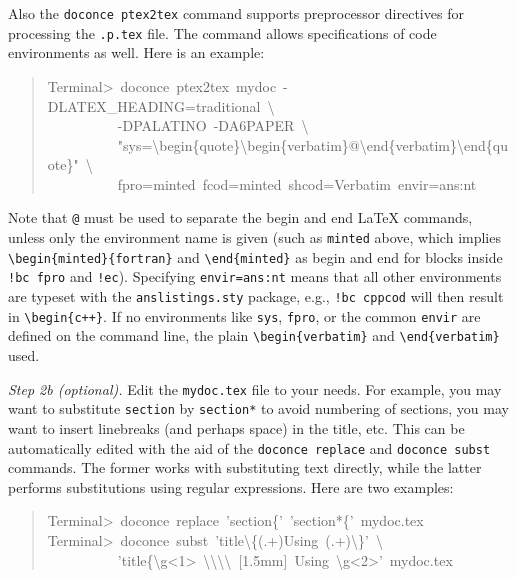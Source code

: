 \documentclass[a4paper]{article}
\begin{document}
Also the \texttt{doconce ptex2tex} command supports preprocessor directives
for processing the \texttt{.p.tex} file. The command allows specifications
of code environments as well. Here is an example:
%
\begin{quote}{\ttfamily \raggedright \noindent
Terminal>~doconce~ptex2tex~mydoc~-DLATEX\_HEADING=traditional~\textbackslash{}\\
~~~~~~~~~~-DPALATINO~-DA6PAPER~\textbackslash{}\\
~~~~~~~~~~"sys=\textbackslash{}begin\{quote\}\textbackslash{}begin\{verbatim\}@\textbackslash{}end\{verbatim\}\textbackslash{}end\{quote\}"~\textbackslash{}\\
~~~~~~~~~~fpro=minted~fcod=minted~shcod=Verbatim~envir=ans:nt
}
\end{quote}

Note that \texttt{@} must be used to separate the begin and end LaTeX
commands, unless only the environment name is given (such as \texttt{minted}
above, which implies \texttt{\textbackslash{}begin\{minted\}\{fortran\}} and \texttt{\textbackslash{}end\{minted\}} as
begin and end for blocks inside \texttt{!bc fpro} and \texttt{!ec}).  Specifying
\texttt{envir=ans:nt} means that all other environments are typeset with the
\texttt{anslistings.sty} package, e.g., \texttt{!bc cppcod} will then result in
\texttt{\textbackslash{}begin\{c++\}}. If no environments like \texttt{sys}, \texttt{fpro}, or the common
\texttt{envir} are defined on the command line, the plain \texttt{\textbackslash{}begin\{verbatim\}}
and \texttt{\textbackslash{}end\{verbatim\}} used.

\emph{Step 2b (optional).} Edit the \texttt{mydoc.tex} file to your needs.
For example, you may want to substitute \texttt{section} by \texttt{section*} to
avoid numbering of sections, you may want to insert linebreaks
(and perhaps space) in the title, etc. This can be automatically
edited with the aid of the \texttt{doconce replace} and \texttt{doconce subst}
commands. The former works with substituting text directly, while the
latter performs substitutions using regular expressions.
Here are two examples:
%
\begin{quote}{\ttfamily \raggedright \noindent
Terminal>~doconce~replace~'section\{'~'section*\{'~mydoc.tex\\
Terminal>~doconce~subst~'title\textbackslash{}\{(.+)Using~(.+)\textbackslash{}\}'~\textbackslash{}\\
~~~~~~~~~~'title\{\textbackslash{}g<1>~\textbackslash{}\textbackslash{}\textbackslash{}\textbackslash{}~{[}1.5mm{]}~Using~\textbackslash{}g<2>'~mydoc.tex
}
\end{quote}
\end{document}

